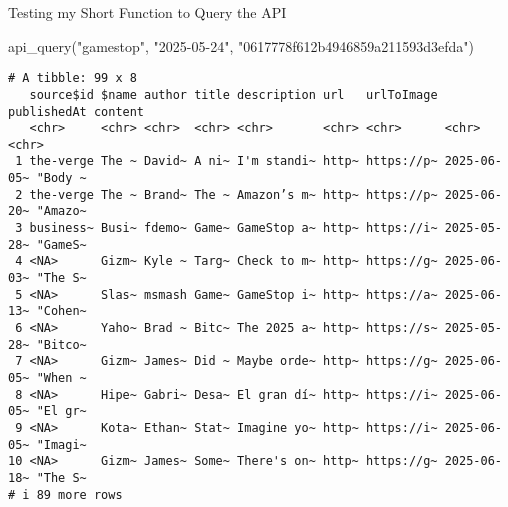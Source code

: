 \documentclass[
  letterpaper,
  DIV=11,
  numbers=noendperiod]{scrartcl}
\newenvironment{Shaded}{\begin{snugshade}}{\end{snugshade}}
\newcommand{\FunctionTok}[1]{\textcolor[rgb]{0.28,0.35,0.67}{#1}}
\newcommand{\NormalTok}[1]{\textcolor[rgb]{0.00,0.23,0.31}{#1}}
\newcommand{\StringTok}[1]{\textcolor[rgb]{0.13,0.47,0.30}{#1}}
\begin{document}
Testing my Short Function to Query the API

\begin{Shaded}
\begin{Highlighting}[]
\FunctionTok{api\_query}\NormalTok{(}\StringTok{"gamestop"}\NormalTok{, }\StringTok{"2025{-}05{-}24"}\NormalTok{, }\StringTok{"0617778f612b4946859a211593d3efda"}\NormalTok{)}
\end{Highlighting}
\end{Shaded}

\begin{verbatim}
# A tibble: 99 x 8
   source$id $name author title description url   urlToImage publishedAt content
   <chr>     <chr> <chr>  <chr> <chr>       <chr> <chr>      <chr>       <chr>  
 1 the-verge The ~ David~ A ni~ I'm standi~ http~ https://p~ 2025-06-05~ "Body ~
 2 the-verge The ~ Brand~ The ~ Amazon’s m~ http~ https://p~ 2025-06-20~ "Amazo~
 3 business~ Busi~ fdemo~ Game~ GameStop a~ http~ https://i~ 2025-05-28~ "GameS~
 4 <NA>      Gizm~ Kyle ~ Targ~ Check to m~ http~ https://g~ 2025-06-03~ "The S~
 5 <NA>      Slas~ msmash Game~ GameStop i~ http~ https://a~ 2025-06-13~ "Cohen~
 6 <NA>      Yaho~ Brad ~ Bitc~ The 2025 a~ http~ https://s~ 2025-05-28~ "Bitco~
 7 <NA>      Gizm~ James~ Did ~ Maybe orde~ http~ https://g~ 2025-06-05~ "When ~
 8 <NA>      Hipe~ Gabri~ Desa~ El gran dí~ http~ https://i~ 2025-06-05~ "El gr~
 9 <NA>      Kota~ Ethan~ Stat~ Imagine yo~ http~ https://i~ 2025-06-05~ "Imagi~
10 <NA>      Gizm~ James~ Some~ There's on~ http~ https://g~ 2025-06-18~ "The S~
# i 89 more rows
\end{verbatim}
\end{document}

